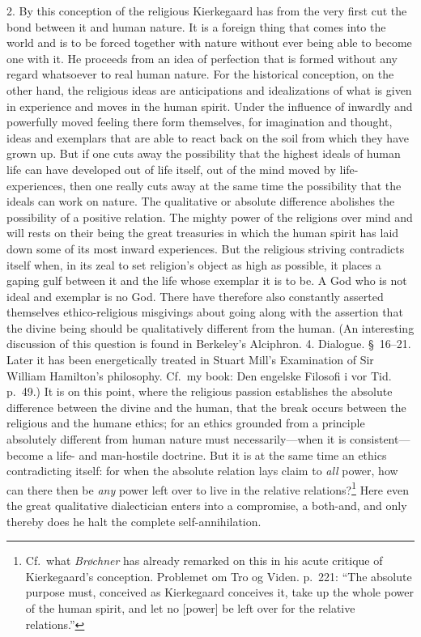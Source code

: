 \documentclass[12pt,a4paper]{book}
\newcommand{\opage}[1]{\marginnote{\footnotesize\textit{[#1]}}}
\begin{document}
2. By this conception of the religious Kierkegaard has from the very first
cut the bond between it and human nature. It is a foreign thing that comes
into the world and is to be forced together with nature without ever being
able to become one with it. He proceeds from an idea of perfection that is
formed without any regard whatsoever to real human nature. For the
historical conception, on the other hand, the religious ideas are
anticipations and idealizations of what is given in experience and moves
in the human spirit. Under the influence of inwardly and powerfully moved
feeling there form themselves, for imagination and thought, ideas and
exemplars that are able to react back on the soil from which they have
grown up. But if one cuts away the possibility that the highest ideals of
human life can have developed out of life itself, out of the mind moved by
life-experiences, then one really cuts away at the same time the
possibility that the ideals can work on nature. The qualitative or
absolute difference abolishes the possibility of a positive relation. The
mighty power of the religions over mind and will rests on their being the
great treasuries in which the human spirit has laid down some of its most
inward experiences. But the religious striving contradicts itself when, in
its zeal to set religion's object as high as possible, it places a gaping
gulf between it and the life whose exemplar it is to be. A God who is not
ideal and exemplar is no God. There have therefore also constantly
asserted themselves ethico-religious misgivings
\opage{115}about going along with the assertion that the divine being
should be qualitatively different from the human.
(An interesting discussion of this question is found in Berkeley's
Alciphron. 4. Dialogue. §~16--21. Later it has been energetically treated
in Stuart Mill's Examination of Sir William Hamilton's philosophy. Cf.\
my book: Den engelske Filosofi i vor Tid. p.~49.) It is on this point,
where the religious passion establishes the absolute difference between
the divine and the human, that the break occurs between the religious and
the humane ethics; for an ethics grounded from a principle absolutely
different from human nature must necessarily---when it is
consistent---become a life- and man-hostile doctrine. But it is at the
same time an ethics contradicting itself: for when the absolute relation
lays claim to \textit{all} power, how can there then be \textit{any} power
left over to live in the relative relations?\footnote{Cf.\ what
\textit{Brøchner} has already remarked on this in his acute critique of
Kierkegaard's conception. Problemet om Tro og Viden. p.~221: ``The
absolute purpose must, conceived as Kierkegaard conceives it, take up the
whole power of the human spirit, and let no [power] be left over for the
relative relations.''}
Here even the great qualitative dialectician enters into a compromise, a
both-and, and only thereby does he halt the complete self-annihilation.
\end{document}
